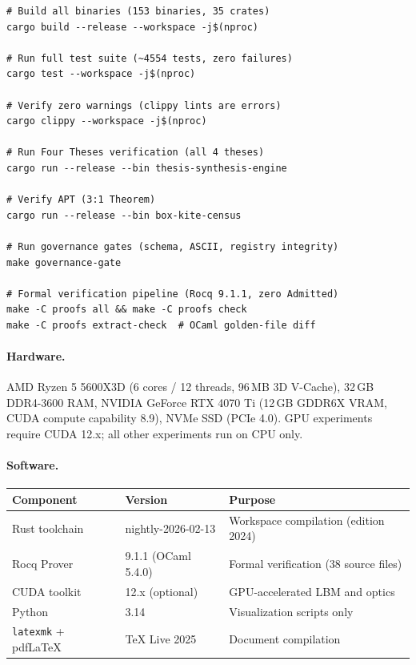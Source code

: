 \documentclass[12pt,openany]{report}
\theoremstyle{definition}
\theoremstyle{plain}
\theoremstyle{remark}
\begin{document}
\begin{verbatim}
# Build all binaries (153 binaries, 35 crates)
cargo build --release --workspace -j$(nproc)

# Run full test suite (~4554 tests, zero failures)
cargo test --workspace -j$(nproc)

# Verify zero warnings (clippy lints are errors)
cargo clippy --workspace -j$(nproc)

# Run Four Theses verification (all 4 theses)
cargo run --release --bin thesis-synthesis-engine

# Verify APT (3:1 Theorem)
cargo run --release --bin box-kite-census

# Run governance gates (schema, ASCII, registry integrity)
make governance-gate

# Formal verification pipeline (Rocq 9.1.1, zero Admitted)
make -C proofs all && make -C proofs check
make -C proofs extract-check  # OCaml golden-file diff
\end{verbatim}

\paragraph{Hardware.}
AMD Ryzen 5 5600X3D (6 cores / 12 threads, 96\,MB 3D V-Cache),
32\,GB DDR4-3600 RAM, NVIDIA GeForce RTX 4070 Ti (12\,GB GDDR6X VRAM,
CUDA compute capability 8.9), NVMe SSD (PCIe 4.0).  GPU experiments
require CUDA 12.x; all other experiments run on CPU only.

\paragraph{Software.}
\begin{center}
\begin{tabular}{lll}
\toprule
\textbf{Component} & \textbf{Version} & \textbf{Purpose} \\
\midrule
Rust toolchain & nightly-2026-02-13 & Workspace compilation (edition 2024) \\
Rocq Prover & 9.1.1 (OCaml 5.4.0) & Formal verification (38 source files) \\
CUDA toolkit & 12.x (optional) & GPU-accelerated LBM and optics \\
Python & 3.14 & Visualization scripts only \\
\texttt{latexmk} + pdf\LaTeX & TeX Live 2025 & Document compilation \\
\bottomrule
\end{tabular}
\end{center}
\end{document}
